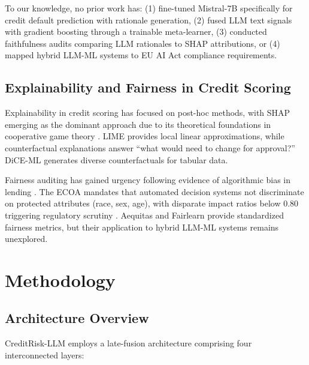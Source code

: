 \documentclass[11pt,a4paper]{article}
\begin{document}
To our knowledge, no prior work has: (1) fine-tuned Mistral-7B specifically for credit default prediction with rationale generation, (2) fused LLM text signals with gradient boosting through a trainable meta-learner, (3) conducted faithfulness audits comparing LLM rationales to SHAP attributions, or (4) mapped hybrid LLM-ML systems to EU AI Act compliance requirements.

\subsection{Explainability and Fairness in Credit Scoring}

Explainability in credit scoring has focused on post-hoc methods, with SHAP emerging as the dominant approach due to its theoretical foundations in cooperative game theory \citep{lundberg2017shap}. LIME \citep{ribeiro2016lime} provides local linear approximations, while counterfactual explanations \citep{wachter2017counterfactual} answer ``what would need to change for approval?'' DiCE-ML \citep{mothilal2020dice} generates diverse counterfactuals for tabular data.

Fairness auditing has gained urgency following evidence of algorithmic bias in lending \citep{bartlett2022consumer}. The ECOA mandates that automated decision systems not discriminate on protected attributes (race, sex, age), with disparate impact ratios below 0.80 triggering regulatory scrutiny \citep{cfpb2014}. Aequitas \citep{saleiro2018aequitas} and Fairlearn provide standardized fairness metrics, but their application to hybrid LLM-ML systems remains unexplored.

\section{Methodology}\label{sec:methodology}

\subsection{Architecture Overview}

CreditRisk-LLM employs a late-fusion architecture comprising four interconnected layers:
\end{document}
